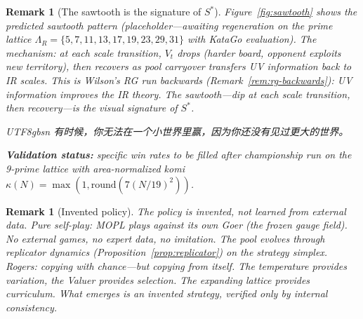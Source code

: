 \documentclass[11pt,a4paper]{article}
\newtheorem{remark}[theorem]{Remark}
\begin{document}
\begin{remark}[The sawtooth is the signature of $S^*$]%
\label{rem:sawtooth}
Figure~\ref{fig:sawtooth} shows the predicted sawtooth pattern
(placeholder---awaiting regeneration on the prime lattice
$\Lambda_R = \{5,7,11,13,17,19,23,29,31\}$ with KataGo evaluation).
The mechanism: at each scale transition, $V_t$ drops
(harder board, opponent exploits new territory),
then recovers as pool carryover transfers UV information
back to IR scales.
This is Wilson's RG run backwards
(Remark~\ref{rem:rg-backwards}):
UV information improves the IR theory.
The sawtooth---dip at each scale transition,
then recovery---is the visual signature of $S^*$.
\begin{CJK}{UTF8}{gbsn}
有时候，你无法在一个小世界里赢，因为你还没有见过更大的世界。
\end{CJK}

\textbf{Validation status:} specific win rates to be filled after
championship run on the 9-prime lattice with area-normalized komi
$\kappa(N) = \max(1, \mathrm{round}(7(N/19)^2))$.
\end{remark}

\begin{remark}[Invented policy]\label{rem:invented}
The policy is \emph{invented}, not learned from external data.
Pure self-play: MOPL plays against its own Goer (the frozen
gauge field).
No external games, no expert data, no imitation.
The pool evolves through replicator dynamics
(Proposition~\ref{prop:replicator}) on the strategy simplex.
Rogers: copying with chance---but copying from \emph{itself}.
The temperature provides variation, the Valuer provides
selection.
The expanding lattice provides curriculum.
What emerges is an invented strategy, verified only by
internal consistency.
\end{remark}
\end{document}
